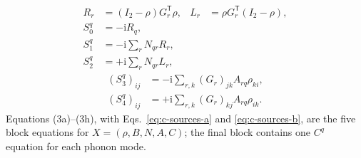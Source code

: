 \documentclass[10pt,twocolumn]{article}
\newcommand{\ii}{\mathrm i}
\newcommand{\I}{I}
\begin{document}
\begin{equation}
\begin{aligned}
R_r&=(\I_2-\rho)G_r^{\mathsf T}\rho,
&L_r&=\rho G_r^{\mathsf T}(\I_2-\rho),\\
S_0^q&=-\ii R_q,\\
S_1^q&=-\ii\sum_rN_{qr}R_r,\\
S_2^q&=+\ii\sum_rN_{qr}L_r,
\end{aligned}
\label{eq:c-sources-a}
\end{equation}
\begin{equation}
\begin{aligned}
(S_3^q)_{ij}&=-\ii\sum_{r,k}(G_r)_{jk}A_{rq}\rho_{ki},\\
(S_4^q)_{ij}&=+\ii\sum_{r,k}(G_r)_{kj}A_{rq}\rho_{ik}.
\end{aligned}
\label{eq:c-sources-b}
\end{equation}
Equations (3a)--(3h), with Eqs.~\eqref{eq:c-sources-a} and
\eqref{eq:c-sources-b}, are the five block equations for
$X=(\rho,B,N,A,C)$; the final block contains one $C^q$ equation for each
phonon mode.
\end{document}
